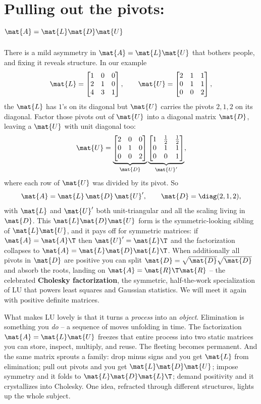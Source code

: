 \section{Pulling out the pivots: \texorpdfstring{$\mat{A}=\mat{L}\mat{D}\mat{U}$}{A=LDU}}
\label{ch09:ldu}

There is a mild asymmetry in $\mat{A}=\mat{L}\mat{U}$ that bothers people, and fixing it
reveals structure. In our example
\[
  \mat{L} = \begin{bmatrix} 1&0&0\\2&1&0\\4&3&1 \end{bmatrix}, \qquad
  \mat{U} = \begin{bmatrix} 2&1&1\\0&1&1\\0&0&2 \end{bmatrix},
\]
the $\mat{L}$ has $1$'s on its diagonal but $\mat{U}$ carries the pivots $2,1,2$ on its
diagonal. Factor those pivots out of $\mat{U}$ into a diagonal matrix $\mat{D}$, leaving a
$\mat{U}$ with unit diagonal too:
\[
  \mat{U} = \underbrace{\begin{bmatrix} 2&0&0\\0&1&0\\0&0&2 \end{bmatrix}}_{\mat{D}}
            \underbrace{\begin{bmatrix} 1 & \tfrac12 & \tfrac12 \\ 0 & 1 & 1 \\ 0 & 0 & 1 \end{bmatrix}}_{\mat{U}'},
\]
where each row of $\mat{U}$ was divided by its pivot. So
\[
  \mat{A} = \mat{L}\,\mat{D}\,\mat{U}', \qquad
  \mat{D}=\diag(2,1,2),
\]
with $\mat{L}$ and $\mat{U}'$ both unit-triangular and all the scaling living in $\mat{D}$.
This $\mat{L}\mat{D}\mat{U}$ form is the symmetric-looking sibling of $\mat{L}\mat{U}$, and it
pays off for symmetric matrices: if $\mat{A}=\mat{A}\T$ then $\mat{U}'=\mat{L}\T$ and the
factorization collapses to $\mat{A}=\mat{L}\mat{D}\mat{L}\T$. When additionally all pivots in
$\mat{D}$ are positive you can split $\mat{D}=\sqrt{\mat{D}}\sqrt{\mat{D}}$ and absorb the
roots, landing on $\mat{A}=\mat{R}\T\mat{R}$ -- the celebrated \textbf{Cholesky
factorization}, the symmetric, half-the-work specialization of LU that powers least squares
and Gaussian statistics. We will meet it again with positive definite matrices.

\begin{aestheticbox}
What makes LU lovely is that it turns a \emph{process} into an \emph{object}. Elimination is
something you \emph{do} -- a sequence of moves unfolding in time. The factorization
$\mat{A}=\mat{L}\mat{U}$ freezes that entire process into two static matrices you can store,
inspect, multiply, and reuse. The fleeting becomes permanent. And the same matrix sprouts a
family: drop minus signs and you get $\mat{L}$ from elimination; pull out pivots and you get
$\mat{L}\mat{D}\mat{U}$; impose symmetry and it folds to $\mat{L}\mat{D}\mat{L}\T$; demand
positivity and it crystallizes into Cholesky. One idea, refracted through different
structures, lights up the whole subject.
\end{aestheticbox}

